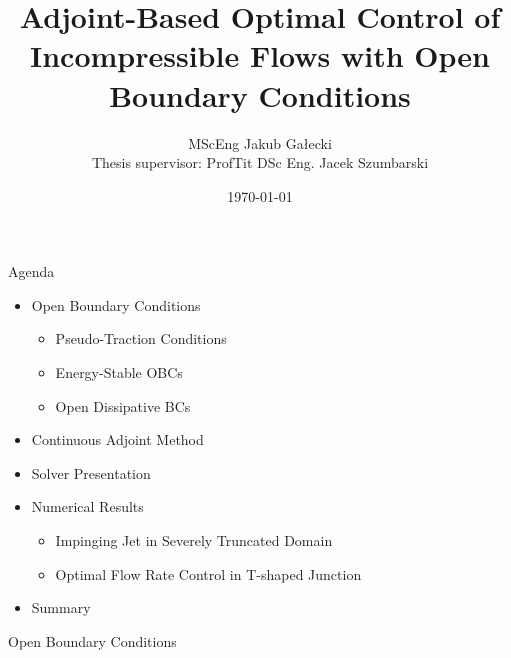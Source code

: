 \documentclass{beamer}
\author{MScEng Jakub Gałecki \\Thesis supervisor: ProfTit DSc Eng. Jacek Szumbarski}
\title{Adjoint-Based Optimal Control of  Incompressible Flows with Open Boundary Conditions}
\institute{\textbf{Institute of Thermal Technology, Silesian University of Technology}}
\date{\vspace{5pt}\today}
\begin{document}
\maketitle


\begin{frame}{Agenda}

	\begin{itemize}
		\setlength\itemsep{1.5em}
		\item Open Boundary Conditions
		\begin{itemize}
			\item Pseudo-Traction Conditions
			\item Energy-Stable OBCs
			\item Open Dissipative BCs
		\end{itemize}
		\item Continuous Adjoint Method
		\item Solver Presentation
		\item Numerical Results
		\begin{itemize}
			\item Impinging Jet in Severely Truncated Domain
			\item Optimal Flow Rate Control in T-shaped Junction
		\end{itemize}
		\item Summary
	\end{itemize}
	
\end{frame}

\begin{frame}[standout]

    Open Boundary Conditions
	
\end{frame}
\end{document}
